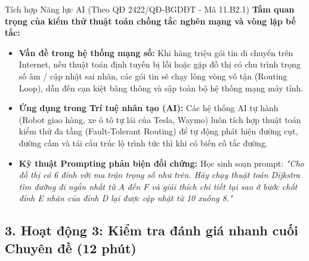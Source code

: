 \documentclass[12pt, a4paper]{article}
\begin{document}
\begin{aibox}{Tích hợp Năng lực AI (Theo QĐ 2422/QĐ-BGDĐT - Mã 11.B2.1)}
    \textbf{Tầm quan trọng của kiểm thử thuật toán chống tắc nghẽn mạng và vòng lặp bế tắc:}
    \begin{itemize}[leftmargin=0.6cm]
        \item \textbf{Vấn đề trong hệ thống mạng số:} Khi hàng triệu gói tin di chuyển trên Internet, nếu thuật toán định tuyến bị lỗi hoặc gặp đồ thị có chu trình trọng số âm / cập nhật sai nhãn, các gói tin sẽ chạy lòng vòng vô tận (Routing Loop), dẫn đến cạn kiệt băng thông và sập toàn bộ hệ thống mạng máy tính.
        \item \textbf{Ứng dụng trong Trí tuệ nhân tạo (AI):} Các hệ thống AI tự hành (Robot giao hàng, xe ô tô tự lái của Tesla, Waymo) luôn tích hợp thuật toán kiểm thử đa tầng (Fault-Tolerant Routing) để tự động phát hiện đường cụt, đường cấm và tái cấu trúc lộ trình tức thì khi có biến cố tắc đường.
        \item \textbf{Kỹ thuật Prompting phản biện đối chứng:} Học sinh soạn prompt: \textit{"Cho đồ thị có 6 đỉnh với ma trận trọng số như trên. Hãy chạy thuật toán Dijkstra tìm đường đi ngắn nhất từ A đến F và giải thích chi tiết tại sao ở bước chốt đỉnh E nhãn của đỉnh D lại được cập nhật từ 10 xuống 8."}
    \end{itemize}
\end{aibox}

\subsection*{3. Hoạt động 3: Kiểm tra đánh giá nhanh cuối Chuyên đề (12 phút)}
\end{document}
